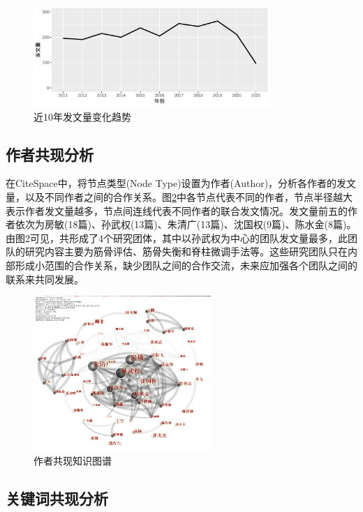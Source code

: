 \documentclass[lang=cn,11pt,a4paper,cite=super,AutoFakeBold,chinesefont=founder]{elegantpaper}
\begin{document}
\begin{figure}[htbp]
  \centering
  \includegraphics[width=0.8\textwidth]{figure/年发文量.pdf}
  \caption{近10年发文量变化趋势}
  \label{figure:1}
\end{figure}

\subsection{作者共现分析} %

在CiteSpace中，将节点类型(Node Type)设置为作者(Author)，分析各作者的发文量，以及不同作者之间的合作关系。图\ref{figure:2}中各节点代表不同的作者，节点半径越大表示作者发文量越多，节点间连线代表不同作者的联合发文情况。发文量前五的作者依次为房敏(18篇)、孙武权(13篇)、朱清广(13篇)、沈国权(9篇)、陈水金(8篇)。由图2可见，共形成了4个研究团体，其中以孙武权为中心的团队发文量最多，此团队的研究内容主要为筋骨评估、筋骨失衡和脊柱微调手法等。这些研究团队只在内部形成小范围的合作关系，缺少团队之间的合作交流，未来应加强各个团队之间的联系来共同发展。

\begin{figure}[!ht]
  \centering
  \includegraphics[width=0.6\textwidth]{figure/作者共现.png}
  \caption{作者共现知识图谱}
  \label{figure:2}
\end{figure}

\subsection{关键词共现分析} %
\end{document}
